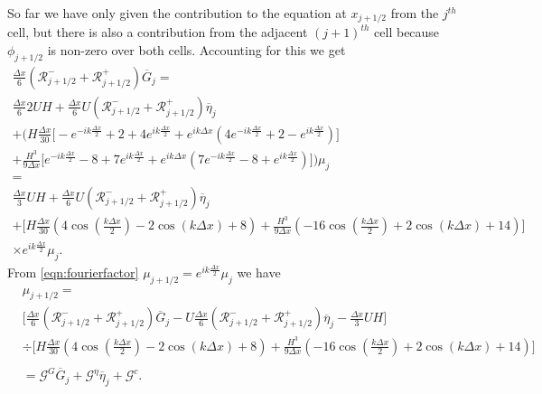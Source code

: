 So far we have only given the contribution to the equation at $x_{j+1/2}$ from the $j^{th}$ cell, but there is also a contribution from the adjacent $(j+1)^{th}$ cell because $\phi_{j+1/2}$ is non-zero over both cells. Accounting for this we get
\begin{multline*}
\frac{\Delta x}{6} \left(\mathcal{R}^-_{j +1/2} + \mathcal{R}^+_{j +1/2} \right)\overline{G}_{j} = \\
\frac{\Delta x}{6} 2UH   + \frac{\Delta x}{6} U \left(\mathcal{R}^-_{j +1/2} + \mathcal{R}^+_{j +1/2} \right)\overline{\eta}_{j} \\ +   \Bigg(H\frac{\Delta x}{30} \Bigg[ -e^{-ik\frac{\Delta x}{2}} +  2 + 4e^{ik\frac{\Delta x}{2}} + e^{ik{\Delta x}}\left(4e^{-ik\frac{\Delta x}{2}} +  2 - e^{ik\frac{\Delta x}{2}}\right) \Bigg]   \\ + \frac{H^3 }{9\Delta x} \Bigg[  e^{-ik\frac{\Delta x}{2}} -8 + 7e^{ik\frac{\Delta x}{2}}  + e^{ik{\Delta x}}\left(7e^{-ik\frac{\Delta x}{2}} -8 + e^{ik\frac{\Delta x}{2}}  \right)  \Bigg]    \Bigg) \mu_j
\\  = \\
\frac{\Delta x}{3}UH   + \frac{\Delta x}{6} U \left(\mathcal{R}^-_{j +1/2} + \mathcal{R}^+_{j +1/2}\right)\overline{\eta}_{j}  \\ +  \Bigg[H\frac{\Delta x}{30} \left( 4\cos\left(\frac{k \Delta x}{2}\right) - 2\cos\left({k \Delta x}\right) + 8\right)   + \frac{H^3 }{9\Delta x} \left(-16\cos\left(\frac{k\Delta x}{2}\right) + 2 \cos\left(k \Delta x\right) + 14\right) \Bigg] \\ \times e^{i k \frac{\Delta x}{2}} \mu_{j}.
\end{multline*}
From \eqref{eqn:fourierfactor} $\mu_{j+1/2} = e^{i k \frac{\Delta x}{2}} \mu_{j} $ we have 
\begin{align}
\label{eqn:2ndFEMutoG}
&\mu_{j+1/2} =  \nonumber\\
&\Bigg[\frac{\Delta x}{6} \left(\mathcal{R}^-_{j +1/2} + \mathcal{R}^+_{j +1/2}\right)  \overline{G}_{j} \nonumber - U\frac{\Delta x}{6} \left(\mathcal{R}^-_{j +1/2} + \mathcal{R}^+_{j +1/2} \right)  \overline{\eta}_{j}   - \frac{\Delta x}{3}UH  \Bigg] \nonumber\\
 &\div  \Bigg[H\frac{\Delta x}{30} \left( 4\cos\left(\frac{k \Delta x}{2}\right) - 2\cos\left({k \Delta x}\right) + 8\right)  + \frac{H^3 }{9\Delta x}\left(-16\cos\left(\frac{k\Delta x}{2}\right) + 2 \cos\left(k \Delta x\right) + 14\right)    \Bigg]
\nonumber \\ \nonumber\\& =  \mathcal{G}^G \overline{G}_{j} + \mathcal{G}^{\eta} \overline{\eta}_{j} + \mathcal{G}^c .
\end{align}
 

